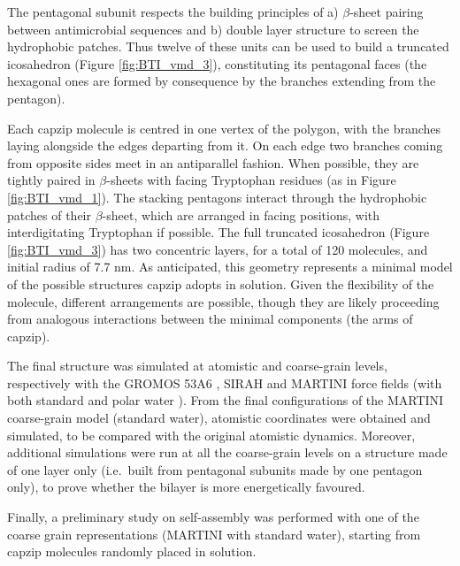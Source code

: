 The pentagonal subunit respects the building principles of a) $\beta$-sheet pairing between antimicrobial sequences and b) double layer structure to screen the hydrophobic patches. Thus twelve of these units can be used to build a truncated icosahedron (Figure \ref{fig:BTI_vmd_3}), constituting its pentagonal faces (the hexagonal ones are formed by consequence by the branches extending from the pentagon).

Each capzip molecule is centred in one vertex of the polygon, with the branches laying alongside the edges departing from it. On each edge two branches coming from opposite sides meet in an antiparallel fashion. When possible, they are tightly paired in $\beta$-sheets with facing Tryptophan residues (as in Figure \ref{fig:BTI_vmd_1}). The stacking pentagons interact through the hydrophobic patches of their $\beta$-sheet, which are arranged in facing positions, with interdigitating Tryptophan if possible.
%
The full truncated icosahedron (Figure \ref{fig:BTI_vmd_3}) has two concentric layers, for a total of 120 molecules, and initial radius of 7.7 nm.
%
As anticipated, this geometry represents a minimal model of the possible structures capzip adopts in solution. Given the flexibility of the molecule, different arrangements are possible, though they are likely proceeding from analogous interactions between the minimal components (the arms of capzip).

The final structure was simulated at atomistic and coarse-grain levels, respectively with the GROMOS 53A6 \citep{Oostenbrink2004}, SIRAH \citep{Machado2018} and MARTINI \citep{Marrink2007, Monticelli2008} force fields (with both standard and polar water \citep{Yesylevskyy2010}).
From the final configurations of the MARTINI coarse-grain model (standard water), atomistic coordinates were obtained and simulated, to be compared with the original atomistic dynamics.
%
Moreover, additional simulations were run at all the coarse-grain levels on a structure made of one layer only (i.e.\ built from pentagonal subunits made by one pentagon only), to prove whether the bilayer is more energetically favoured.

Finally, a preliminary study on self-assembly was performed with one of the coarse grain representations (MARTINI with standard water), starting from capzip molecules randomly placed in solution.

